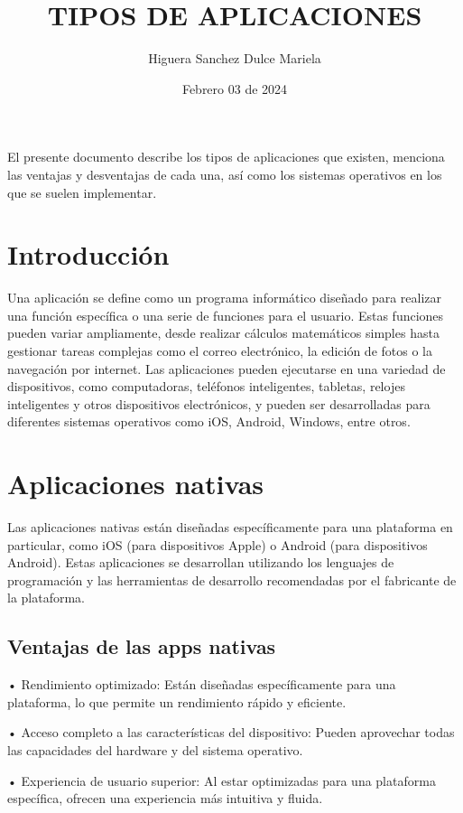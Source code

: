 \documentclass{article}
\title{TIPOS DE APLICACIONES}
\author{Higuera Sanchez Dulce Mariela}
\date{Febrero 03 de 2024}
\begin{document}
 
	
	\maketitle El presente documento describe los tipos de aplicaciones que existen,  menciona las ventajas y desventajas de cada una, así como los sistemas operativos en los que se suelen implementar.
	
	\begin{multicols}{2}
		\section{Introducción}
		Una aplicación se define como un programa informático diseñado para realizar una función específica o una serie de funciones para el usuario. Estas funciones pueden variar ampliamente, desde realizar cálculos matemáticos simples hasta gestionar tareas complejas como el correo electrónico, la edición de fotos o la navegación por internet. Las aplicaciones pueden ejecutarse en una variedad de dispositivos, como computadoras, teléfonos inteligentes, tabletas, relojes inteligentes y otros dispositivos electrónicos, y pueden ser desarrolladas para diferentes sistemas operativos como iOS, Android, Windows, entre otros.
		
		
		\section{Aplicaciones nativas}
		
		Las aplicaciones nativas están diseñadas específicamente para una plataforma en particular, como iOS (para dispositivos Apple) o Android (para dispositivos Android). Estas aplicaciones se desarrollan utilizando los lenguajes de programación y las herramientas de desarrollo recomendadas por el fabricante de la plataforma.
		
		
		\subsection{Ventajas de las apps nativas}
		
		• Rendimiento optimizado: Están diseñadas específicamente para una plataforma, lo que permite un rendimiento rápido y eficiente.
		
		• Acceso completo a las características del dispositivo: Pueden aprovechar todas las capacidades del hardware y del sistema operativo.
		
		• Experiencia de usuario superior: Al estar optimizadas para una plataforma específica, ofrecen una experiencia más intuitiva y fluida.
		

\end{multicols}
\end{document}
